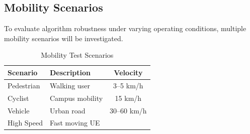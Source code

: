 \documentclass[12pt,a4paper]{article}\usepackage[a4paper,margin=1in]{geometry}\usepackage{graphicx}\usepackage{longtable}\usepackage{booktabs}\usepackage{hyperref}\usepackage{enumitem}\usepackage{amsmath}\usepackage{tikz}\usepackage{pgfgantt}\usepackage{setspace}\setstretch{1.15}\usetikzlibrary{positioning,arrows.meta,shapes.geometric}
\begin{document}
	
	\subsection{Mobility Scenarios}
	
	To evaluate algorithm robustness under varying operating conditions, multiple mobility scenarios will be investigated.
	
	\begin{table}[h]
		
		\centering
		
		\caption{Mobility Test Scenarios}
		
		\begin{tabular}{p{5cm}p{8cm}c}
			
			\toprule
			
			Scenario
			
			&
			
			Description
			
			&
			
			Velocity
			
			\\
			
			\midrule
			
			Pedestrian
			
			&
			
			Walking user
			
			&
			
			3--5 km/h
			
			\\
			
			Cyclist
			
			&
			
			Campus mobility
			
			&
			
			15 km/h
			
			\\
			
			Vehicle
			
			&
			
			Urban road
			
			&
			
			30--60 km/h
			
			\\
			
			High Speed
			
			&
			
			Fast moving UE
			
			&
			

\end{tabular}
\end{table}
\end{document}
